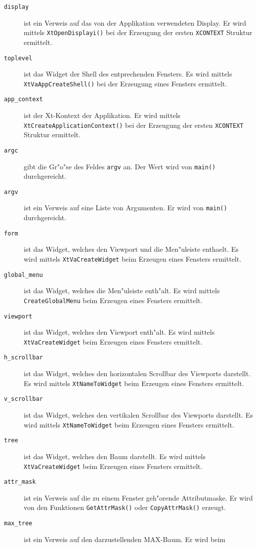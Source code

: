 \begin{description}
\item[\tt display]
   ist ein Verweis auf das von der Applikation verwendeten Display.
   Er wird mittels {\tt XtOpenDisplayi()} bei der Erzeugung der ersten
   {\tt XCONTEXT} Struktur ermittelt.
\item[\tt toplevel]
   ist das Widget der Shell des entprechenden Fensters.
   Es wird mittels {\tt XtVaAppCreateShell()} bei der Erzeugung eines
   Fensters ermittelt.
\item[\tt app\_context]
   ist der Xt-Kontext der Applikation.
   Er wird mittels {\tt XtCreateApplicationContext()} bei der Erzeugung
   der ersten {\tt XCONTEXT} Struktur ermittelt.
\item[\tt argc]
   gibt die Gr"o"se des Feldes {\tt argv} an. Der Wert wird von {\tt main()}
   durchgereicht.
\item[\tt argv]
   ist ein Verweis auf eine Liste von Argumenten. Er wird von {\tt main()}
   durchgereicht.
\item[\tt form]
   ist das Widget, welches den Viewport und die Men"uleiste enthaelt.
   Es wird mittels {\tt XtVaCreateWidget} beim Erzeugen eines Fensters
   ermittelt.
\item[\tt global\_menu]
   ist das Widget, welches die Men"uleiste enth"alt.
   Es wird mittels {\tt CreateGlobalMenu} beim Erzeugen eines Fensters
   ermittelt.
\item[\tt viewport]
   ist das Widget, welches den Viewport enth"alt.
   Es wird mittels {\tt XtVaCreateWidget} beim Erzeugen eines Fensters
   ermittelt.
\item[\tt h\_scrollbar]
   ist das Widget, welches den horizontalen Scrollbar des Viewports
   darstellt. Es wird mittels {\tt XtNameToWidget} beim Erzeugen eines 
   Fensters ermittelt.
\item[\tt v\_scrollbar]
   ist das Widget, welches den vertikalen Scrollbar des Viewports
   darstellt. Es wird mittels {\tt XtNameToWidget} beim Erzeugen eines 
   Fensters ermittelt.
\item[\tt tree]
   ist das Widget, welches den Baum darstellt.
   Es wird mittels {\tt XtVaCreateWidget} beim Erzeugen eines Fensters
   ermittelt.
\item[\tt attr\_mask]
   ist ein Verweis auf die zu einem Fenster geh"orende Attributmaske.
   Er wird von den Funktionen {\tt GetAttrMask()} oder 
   {\tt CopyAttrMask()} erzeugt.
\item[\tt max\_tree]
   ist ein Verweis auf den darzustellenden MAX-Baum. Er wird beim

\end{description}
